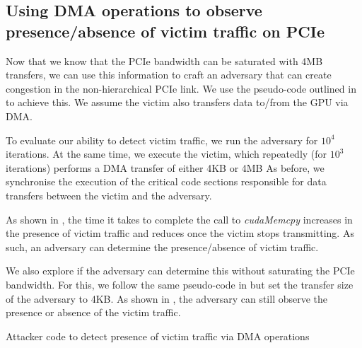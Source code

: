 \subsection{Using DMA operations to observe presence/absence of victim traffic on PCIe}
\label{subsec:interconnect-sc-dma-evaluation}

Now that we know that the PCIe bandwidth can be saturated with 4MB transfers, we can use this information to craft an adversary that can create congestion in the non-hierarchical PCIe link.
We use the pseudo-code outlined in  to achieve this.
We assume the victim also transfers data to/from the GPU via DMA.

To evaluate our ability to detect victim traffic, we run the adversary for $10^4$ iterations.
At the same time, we execute the victim, which repeatedly (for $10^3$ iterations) performs a DMA transfer of either 4KB or 4MB
As before, we synchronise the execution of the critical code sections responsible for data transfers between the victim and the adversary. 

As shown in , the time it takes to complete the call to \textit{cudaMemcpy} increases in the presence of victim traffic and reduces once the victim stops transmitting.
As such, an adversary can determine the presence/absence of victim traffic.

We also explore if the adversary can determine this without saturating the PCIe bandwidth.
For this, we follow the same pseudo-code in  but set the transfer size of the adversary to 4KB.
As shown in , the adversary can still observe the presence or absence of the victim traffic.


\begin{minipage}{\textwidth}
    
    \captionsetup{type=lstlisting}
    \caption{Attacker code to detect presence of victim traffic via DMA operations}
    \label{lst:timing-victim-with-dma}
\end{minipage}

